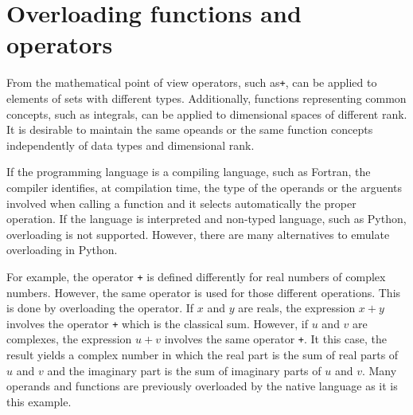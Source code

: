 
\chapter{Overloading functions and operators}

From the mathematical point of view operators, such as\texttt{+}, can be 
applied to elements of sets with different types. Additionally, functions representing 
common concepts, such as integrals, can be applied to dimensional spaces of different rank. 
It is desirable to maintain the same opeands or the same function concepts independently 
of data types and dimensional rank.  

If the programming language is a compiling language, such as Fortran, 
the compiler identifies, at compilation time, the type of the operands or the arguents 
involved when calling a function and it selects automatically the proper operation. 
If the language is interpreted and non-typed language, such as Python, overloading is not supported. 
However, there are many alternatives to emulate overloading in Python. 

For example, the operator \texttt{+} 
is defined differently for real numbers of complex numbers. However, the same operator 
is used for those different operations. This is done by overloading the operator. 
If $x$ and $y$ are reals, the expression $ x+y $ involves the operator \texttt{+}
which is the classical sum. 
However, if  $u$ and $v$ are complexes, 
the expression $ u+v $ involves the same operator \texttt{+}. It this case, 
the result yields a complex number in which 
the real part is the sum of real parts of $ u $ and $ v $
and the imaginary part is the sum of imaginary parts of $ u $ and $ v $.
Many operands and functions are previously overloaded by the native language 
as it is this example. 





